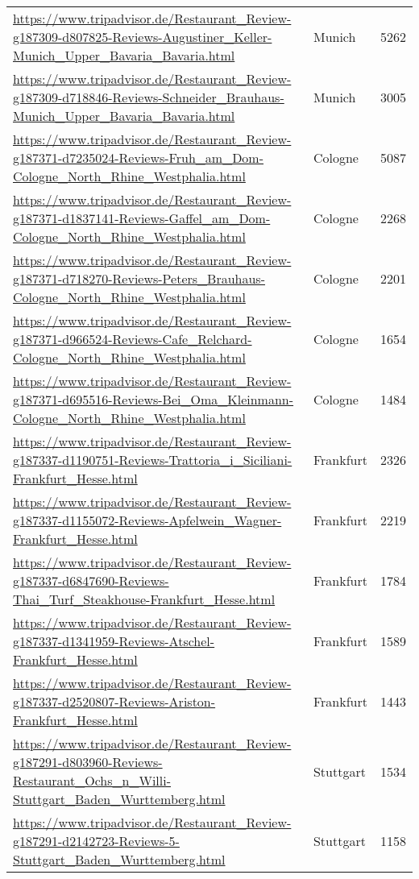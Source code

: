 \begin{table}[]
{\begin{tabular}{lll}
\url{https://www.tripadvisor.de/Restaurant\_Review-g187309-d807825-Reviews-Augustiner\_Keller-Munich\_Upper\_Bavaria\_Bavaria.html} & Munich & 5262 \\ 
\url{https://www.tripadvisor.de/Restaurant\_Review-g187309-d718846-Reviews-Schneider\_Brauhaus-Munich\_Upper\_Bavaria\_Bavaria.html} & Munich & 3005 \\ 
\url{https://www.tripadvisor.de/Restaurant\_Review-g187371-d7235024-Reviews-Fruh\_am\_Dom-Cologne\_North\_Rhine\_Westphalia.html} & Cologne & 5087 \\ 
\url{https://www.tripadvisor.de/Restaurant\_Review-g187371-d1837141-Reviews-Gaffel\_am\_Dom-Cologne\_North\_Rhine\_Westphalia.html} & Cologne & 2268 \\ 
\url{https://www.tripadvisor.de/Restaurant\_Review-g187371-d718270-Reviews-Peters\_Brauhaus-Cologne\_North\_Rhine\_Westphalia.html} & Cologne & 2201 \\ 
\url{https://www.tripadvisor.de/Restaurant\_Review-g187371-d966524-Reviews-Cafe\_Relchard-Cologne\_North\_Rhine\_Westphalia.html} & Cologne & 1654 \\ 
\url{https://www.tripadvisor.de/Restaurant\_Review-g187371-d695516-Reviews-Bei\_Oma\_Kleinmann-Cologne\_North\_Rhine\_Westphalia.html} & Cologne & 1484 \\ 
\url{https://www.tripadvisor.de/Restaurant\_Review-g187337-d1190751-Reviews-Trattoria\_i\_Siciliani-Frankfurt\_Hesse.html} & Frankfurt & 2326 \\ 
\url{https://www.tripadvisor.de/Restaurant\_Review-g187337-d1155072-Reviews-Apfelwein\_Wagner-Frankfurt\_Hesse.html} & Frankfurt & 2219 \\ 
\url{https://www.tripadvisor.de/Restaurant\_Review-g187337-d6847690-Reviews-Thai\_Turf\_Steakhouse-Frankfurt\_Hesse.html} & Frankfurt & 1784 \\ 
\url{https://www.tripadvisor.de/Restaurant\_Review-g187337-d1341959-Reviews-Atschel-Frankfurt\_Hesse.html} & Frankfurt & 1589 \\ 
\url{https://www.tripadvisor.de/Restaurant\_Review-g187337-d2520807-Reviews-Ariston-Frankfurt\_Hesse.html} & Frankfurt & 1443 \\ 
\url{https://www.tripadvisor.de/Restaurant\_Review-g187291-d803960-Reviews-Restaurant\_Ochs\_n\_Willi-Stuttgart\_Baden\_Wurttemberg.html} & Stuttgart & 1534 \\ 
\url{https://www.tripadvisor.de/Restaurant\_Review-g187291-d2142723-Reviews-5-Stuttgart\_Baden\_Wurttemberg.html} & Stuttgart & 1158 \\ 

\end{tabular}}
\end{table}
